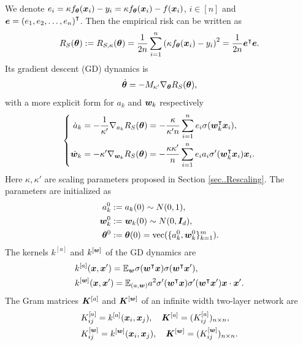 \documentclass{article}
\begin{document}
We denote $e_i = \kappa f_{\bm{\theta}}(\bm{x}_i) - y_i = \kappa f_{\bm{\theta}}(\bm{x}_i) - f(\bm{x}_i)$, $i\in[n]$ and $\bm{e} = {(e_1, e_2, \ldots, e_n)}^{\intercal}$. Then the empirical risk can be written as
\begin{equation}
    R_S(\bm{\theta}):=R_{S,\kappa}(\bm{\theta}) = \frac{1}{2n}\sum_{i=1}^n{\left(\kappa f_{\bm{\theta}}(\bm{x}_i)-y_i\right)}^2 = \frac{1}{2n}\bm{e}^{\intercal}\bm{e}.
\end{equation}
Its gradient descent (GD) dynamics is
\begin{equation}\label{eqn:gd_dyn}
    \dot{\bm{\theta}} = -M_{\kappa'}\nabla_{\bm{\theta}}R_S(\bm{\theta}),
\end{equation}
with a more explicit form for $a_k$ and $\bm{w}_k$ respectively
\begin{equation}
    \left \{
    \begin{aligned}
        \dot{a}_k   & = -\frac{1}{\kappa'}\nabla_{a_k}R_S(\bm{\theta}) = -\frac{\kappa}{\kappa'n}\sum_{i=1}^{n}e_i\sigma(\bm{w}_k^\intercal\bm{x}_i), \\
        \dot{\bm{w}}_k & =-\kappa'\nabla_{\bm{w}_k}R_S(\bm{\theta}) = -\frac{\kappa\kappa'}{n}\sum_{i=1}^n e_i a_i\sigma'(\bm{w}_k^\intercal\bm{x}_i)\bm{x}_i.
    \end{aligned}
    \right.\label{eq..MainDynamics}
\end{equation}
Here $\kappa,\kappa'$ are scaling parameters proposed in Section \ref{sec..Rescaling}.
The parameters are initialized as
\begin{align}
    a^0_k     & :=a_k(0)\sim N(0,1),                                                                    \\
    \bm{w}_k^0   & :=\bm{w}_k(0)\sim N(0,\bm{I}_d),                                                              \\
    \bm{\theta}^0 & := \bm{\theta}(0) = \mathrm{vec}(\{a_k^0, \bm{w}_k^0\}_{k=1}^m).\label{eq..MainInitialization}
\end{align}
The kernels $k^{[a]}$ and $k^{[\bm{w}]}$ of the GD dynamics are
\begin{equation}
    \begin{aligned}
         & k^{[a]}(\bm{x},\bm{x}')=\mathbb{E}_{\bm{w}}\sigma(\bm{w}^\intercal\bm{x})\sigma(\bm{w}^\intercal\bm{x}'),                        \\
         & k^{[\bm{w}]}(\bm{x},\bm{x}')=\mathbb{E}_{(a,\bm{w})}a^2\sigma'(\bm{w}^\intercal\bm{x})\sigma'(\bm{w}^\intercal\bm{x}')\bm{x}\cdot\bm{x}'. \\
    \end{aligned}
\end{equation}
The Gram matrices $\bm{K}^{[a]}$ and $\bm{K}^{[\bm{w}]}$ of an infinite width two-layer network are
\begin{equation}
    \begin{aligned}
         & K^{[a]}_{ij}=k^{[a]}(\bm{x}_i,\bm{x}_j), \quad \bm{K}^{[a]}=(K_{ij}^{[a]})_{n\times n},         \\
         & K^{[\bm{w}]}_{ij}=k^{[\bm{w}]}(\bm{x}_i,\bm{x}_j), \quad \bm{K}^{[\bm{w}]}=(K_{ij}^{[\bm{w}]})_{n\times n}.
    \end{aligned}
\end{equation}
\end{document}
